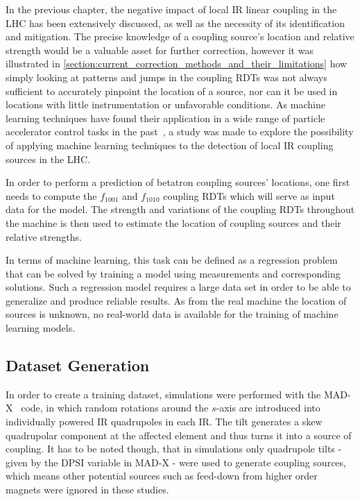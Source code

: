 In the previous chapter, the negative impact of local IR linear coupling in the LHC has been extensively discussed, as well as the necessity of its identification and mitigation.
The precise knowledge of a coupling source's location and relative strength would be a valuable asset for further correction, however it was illustrated in \cref{section:current_correction_methods_and_their_limitations} how simply looking at patterns and jumps in the coupling RDTs was not always sufficient to accurately pinpoint the  location of a source, nor can it be used in locations with little instrumentation or unfavorable conditions.
As machine learning techniques have found their application in a wide range of particle accelerator control tasks in the past~\cite{IPAC:Fol:Machine_Learning_Methods_for_Optics_Measurements_and_Corrections_at_LHC, IEEE:Edelen:Neural_Networks_Modeling_Control_Particle_Accelerators, EPAC:Bozoki:Neural_Networks_Orbit_Control_Accelerators, IPAC:Meier:Orbit_Correction_Studies_using_Neural_Networks, EPAC:Kijima:Beam_Diagnostic_System_for_Accelerator_using_Neural_Networks, PRAB:Fol:Detection_Faulty_BPMs, EPJP:Fol:Supervised_Learning_Reconstruction_Magnet_Errors}, a study was made to explore the possibility of applying machine learning techniques to the detection of local IR coupling sources in the LHC.

In order to perform a prediction of betatron coupling sources' locations, one first needs to compute the \(f_{1001}\) and \(f_{1010}\) coupling RDTs which will serve as input data for the model.
The strength and variations of the coupling RDTs throughout the machine is then used to estimate the location of coupling sources and their relative strengths.

In terms of machine learning, this task can be defined as a regression problem that can be solved by training a model using measurements and corresponding solutions.
Such a regression model requires a large data set in order to be able to generalize and produce reliable results.
As from the real machine the location of sources is unknown, no real-world data is available for the training of machine learning models.

\subsection{Dataset Generation}

In order to create a training dataset, simulations were performed with the MAD-X~\cite{CODE:MADX_guide} code, in which random rotations around the \(s\)-axis are introduced into individually powered IR quadrupoles in each IR.
The tilt generates a skew quadrupolar component at the affected element and thus turns it into a source of coupling.
It has to be noted though, that in simulations only quadrupole tilts - given by the \(\mathrm{DPSI}\) variable in MAD-X - were used to generate coupling sources, which means other potential sources such as feed-down from higher order magnets were ignored in these studies.


